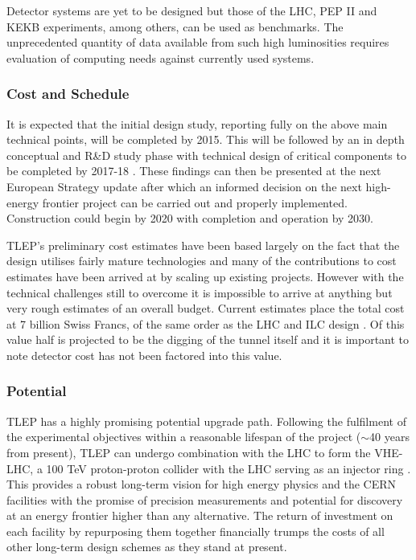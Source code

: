 Detector systems are yet to be designed but those of the LHC, PEP II and KEKB experiments, among others, can be used as benchmarks. The unprecedented quantity of data available from such high luminosities requires evaluation of computing needs against currently used systems. 

\subsubsection{Cost and Schedule}

It is expected that the initial design study, reporting fully on the above main technical points, will be completed by 2015. This will be followed by an in depth conceptual and R\&D study phase with technical design of critical components to be completed by 2017-18 \cite{TLEP:CERNOverview}. These findings can then be presented at the next European Strategy update after which an informed decision on the next high-energy frontier project can be carried out and properly implemented. Construction could begin by 2020 with completion and operation by 2030. 

TLEP's preliminary cost estimates have been based largely on the fact that the design utilises fairly mature technologies and many of the contributions to cost estimates have been arrived at by scaling up existing projects. However with the technical challenges still to overcome it is impossible to arrive at anything but very rough estimates of an overall budget. Current estimates place the total cost at 7 billion Swiss Francs, of the same order as the LHC and ILC design \cite{TLEP:Janot}. Of this value half is projected to be the digging of the tunnel itself and it is important to note detector cost has not been factored into this value.

\subsubsection{Potential}

TLEP has a highly promising potential upgrade path. Following the fulfilment of the experimental objectives within a reasonable lifespan of the project ($\sim$40 years from present), TLEP can undergo combination with the LHC to form the VHE-LHC, a 100 TeV proton-proton collider with the LHC serving as an injector ring \cite{TLEP:Janot}. This provides a robust long-term vision for high energy physics and the CERN facilities with the promise of precision measurements and potential for discovery at an energy frontier higher than any alternative. The return of investment on each facility by repurposing them together financially trumps the costs of all other long-term design schemes as they stand at present.
